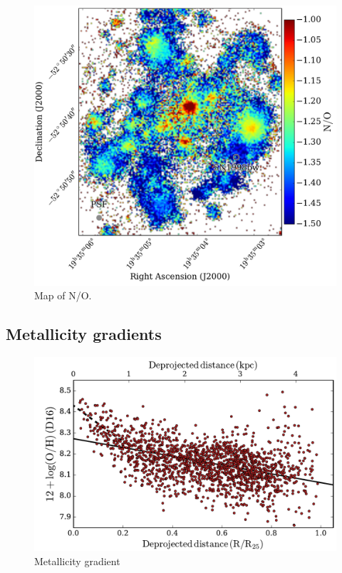 \documentclass[traditabstract]{aa}
\begin{document}

\begin{figure}
\includegraphics[angle=0, width=0.99\columnwidth]{Figs/MUSE_SN1998bw_NO.pdf}
\caption{Map of N/O.}
\label{fig:no}
\end{figure}

\subsection{Metallicity gradients}
\label{sec:metgrad}

\begin{figure}
\includegraphics[angle=0, width=0.99\columnwidth]{Figs/MUSE_SN1998bw_metgrad.pdf}
\caption{Metallicity gradient}
\label{fig:metgrad}
\end{figure}
\end{document}
